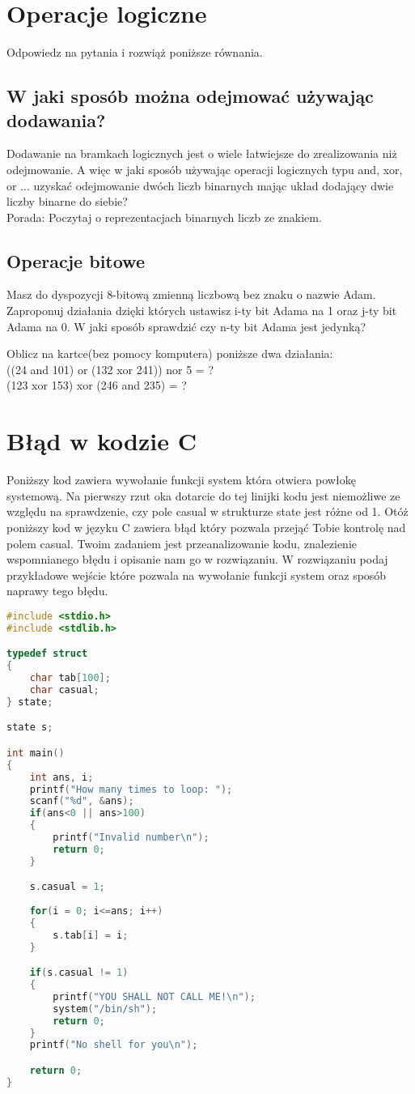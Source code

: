 \documentclass{article}
\begin{document}
\section{Operacje logiczne}
Odpowiedz na pytania i rozwiąż poniższe równania.
\subsection{W jaki sposób można odejmować używając dodawania?}
Dodawanie na bramkach logicznych jest o wiele łatwiejsze do zrealizowania niż odejmowanie. A więc w jaki sposób używając operacji logicznych typu and, xor, or ... uzyskać odejmowanie dwóch liczb binarnych mając układ dodający dwie liczby binarne do siebie? \\
Porada: Poczytaj o reprezentacjach binarnych liczb ze znakiem.
\subsection{Operacje bitowe}
Masz do dyspozycji 8-bitową zmienną liczbową bez znaku o nazwie Adam. Zaproponuj działania dzięki których ustawisz i-ty bit Adama na 1 oraz j-ty bit Adama na 0. W jaki sposób sprawdzić czy n-ty bit Adama jest jedynką?

Oblicz na kartce(bez pomocy komputera) poniższe dwa działania:\\
((24 and 101) or (132 xor 241)) nor 5 = ? \\
(123 xor 153) xor (246 and 235) = ? \\

\section{Błąd w kodzie C}
Poniższy kod zawiera wywołanie funkcji system która otwiera powłokę systemową. Na pierwszy rzut oka dotarcie do tej linijki kodu jest niemożliwe ze względu na sprawdzenie, czy pole casual w strukturze state jest różne od 1. Otóż poniższy kod w języku C zawiera błąd który pozwala przejąć Tobie kontrolę nad polem casual. Twoim zadaniem jest przeanalizowanie kodu, znalezienie wspomnianego błędu i opisanie nam go w rozwiązaniu. W rozwiązaniu podaj przykładowe wejście które pozwala na wywołanie funkcji system oraz sposób naprawy tego błędu.

\begin{lstlisting}[frame=single, language=c]
#include <stdio.h>
#include <stdlib.h>

typedef struct
{
	char tab[100];
	char casual;
} state;

state s;

int main()
{
	int ans, i;
	printf("How many times to loop: ");
	scanf("%d", &ans);
	if(ans<0 || ans>100)
	{
		printf("Invalid number\n");
		return 0;
	}

	s.casual = 1;
	
	for(i = 0; i<=ans; i++)
	{
		s.tab[i] = i;
	}

	if(s.casual != 1)
	{
		printf("YOU SHALL NOT CALL ME!\n");
		system("/bin/sh");
		return 0;
	}
	printf("No shell for you\n");

	return 0;
}

\end{lstlisting}
\end{document}
